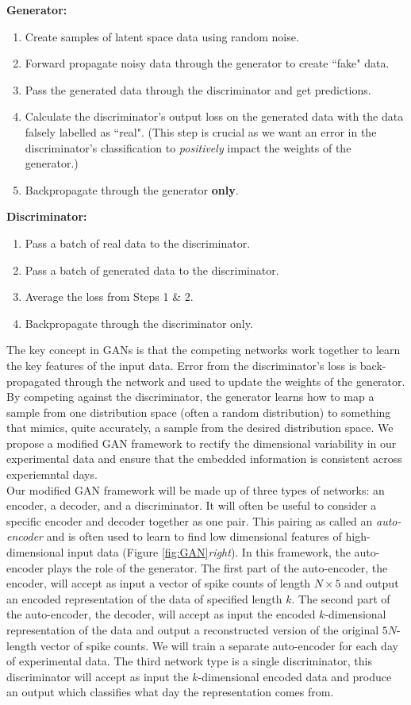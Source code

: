 \documentclass[12pt]{article}
\begin{document}
\textbf{Generator:} \\
\begin{enumerate}
  \item Create samples of latent space data using random noise.
  \item Forward propagate noisy data through the generator to create ``fake" data.
  \item Pass the generated data through the discriminator and get predictions.
  \item Calculate the discriminator's output loss on the generated data with the data falsely labelled as ``real". (This step is crucial as we want an error in the discriminator's classification to \textit{positively} impact the weights of the generator.)
  \item Backpropagate through the generator \textbf{only}.
  \end{enumerate}
  \textbf{Discriminator:} \\
  \begin{enumerate}
    \item Pass a batch of real data to the discriminator.
    \item Pass a batch of generated data to the discriminator.
    \item Average the loss from Steps 1 \& 2.
    \item Backpropagate through the discriminator only.
  \end{enumerate}
\indent The key concept in GANs is that the competing networks work together to learn the key features of the input data. Error from the discriminator's loss is back-propagated through the network and used to update the weights of the generator. By competing against the discriminator, the generator learns how to map a sample from one distribution space (often a random distribution) to something that mimics, quite accurately, a sample from the desired distribution space. We propose a modified GAN framework to rectify the dimensional variability in our experimental data and ensure that the embedded information is consistent across experiemntal days. \\
\indent Our modified GAN framework will be made up of three types of networks: an encoder, a decoder, and a discriminator. It will often be useful to consider a specific encoder and decoder together as one pair. This pairing as called an \textit{auto-encoder} and is often used to learn to find low dimensional features of high-dimensional input data (Figure \ref{fig:GAN}\textit{right}). In this framework, the auto-encoder plays the role of the generator. The first part of the auto-encoder, the encoder, will accept as input a vector of spike counts of length $N\times 5$ and output an encoded representation of the data of specified length $k$. The second part of the auto-encoder, the decoder, will accept as input the encoded $k$-dimensional representation of the data and output a reconstructed version of the original $5N$-length vector of spike counts. We will train a separate auto-encoder for each day of experimental data. The third network type is a single discriminator, this discriminator will accept as input the $k$-dimensional encoded data and produce an output which classifies what day the representation comes from. \\
\end{document}
